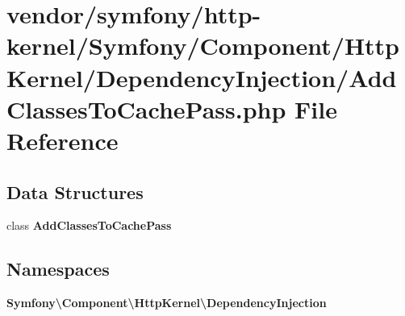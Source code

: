 \section{vendor/symfony/http-\/kernel/\+Symfony/\+Component/\+Http\+Kernel/\+Dependency\+Injection/\+Add\+Classes\+To\+Cache\+Pass.php File Reference}
\label{_add_classes_to_cache_pass_8php}
\subsection*{Data Structures}
\begin{DoxyCompactItemize}
\item 
class {\bf Add\+Classes\+To\+Cache\+Pass}
\end{DoxyCompactItemize}
\subsection*{Namespaces}
\begin{DoxyCompactItemize}
\item 
 {\bf Symfony\textbackslash{}\+Component\textbackslash{}\+Http\+Kernel\textbackslash{}\+Dependency\+Injection}
\end{DoxyCompactItemize}
